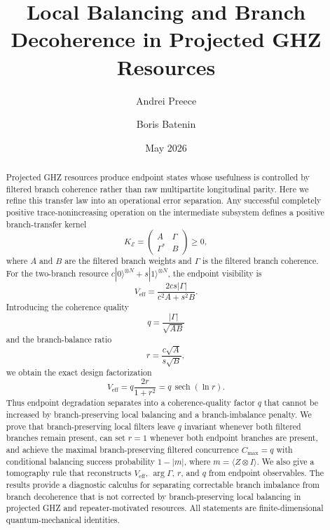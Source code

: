\documentclass[reprint,aps,pra,superscriptaddress,nofootinbib,longbibliography]{revtex4-2}
\newcommand{\ket}[1]{|#1\rangle}
\newcommand{\sech}{\operatorname{sech}}
\newcommand{\Veff}{V_{\mathrm{eff}}}
\newcommand{\Kbr}{K_{\mathcal E}}
\begin{document}
\title{Local Balancing and Branch Decoherence in Projected GHZ Resources}

\author{Andrei Preece}

\author{Boris Batenin}

\date{May 2026}

\begin{abstract}
Projected GHZ resources produce endpoint states whose usefulness is controlled by filtered branch coherence rather than raw multipartite longitudinal parity.  Here we refine this transfer law into an operational error separation.  Any successful completely positive trace-nonincreasing operation on the intermediate subsystem defines a positive branch-transfer kernel
\[
\Kbr=\begin{pmatrix}A&\Gamma\\ \Gamma^*&B\end{pmatrix}\ge0,
\]
where \(A\) and \(B\) are the filtered branch weights and \(\Gamma\) is the filtered branch coherence.  For the two-branch resource \(c\ket{0}^{\otimes N}+s\ket{1}^{\otimes N}\), the endpoint visibility is
\[
\Veff=\frac{2cs|\Gamma|}{c^2A+s^2B}.
\]
Introducing the coherence quality
\[
q=\frac{|\Gamma|}{\sqrt{AB}}
\]
and the branch-balance ratio
\[
r=\frac{c\sqrt A}{s\sqrt B},
\]
we obtain the exact design factorization
\[
\Veff=q\frac{2r}{1+r^2}=q\,\sech(\ln r).
\]
Thus endpoint degradation separates into a coherence-quality factor \(q\) that cannot be increased by branch-preserving local balancing and a branch-imbalance penalty.  We prove that branch-preserving local filters leave \(q\) invariant whenever both filtered branches remain present, can set \(r=1\) whenever both endpoint branches are present, and achieve the maximal branch-preserving filtered concurrence \(C_{\max}=q\) with conditional balancing success probability \(1-|m|\), where \(m=\langle Z\otimes I\rangle\).  We also give a tomography rule that reconstructs \(\Veff\), \(\arg\Gamma\), \(r\), and \(q\) from endpoint observables.  The results provide a diagnostic calculus for separating correctable branch imbalance from branch decoherence that is not corrected by branch-preserving local balancing in projected GHZ and repeater-motivated resources.  All statements are finite-dimensional quantum-mechanical identities.
\end{abstract}

\maketitle
\end{document}
